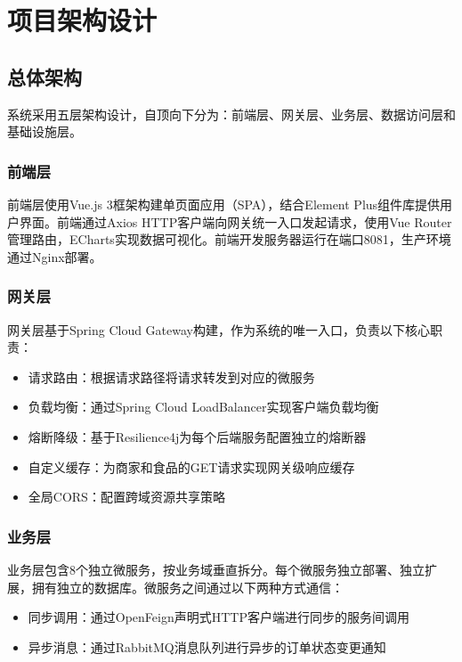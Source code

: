 
\chapter{项目架构设计}

\section{总体架构}

系统采用五层架构设计，自顶向下分为：前端层、网关层、业务层、数据访问层和基础设施层。

\subsection{前端层}

前端层使用Vue.js 3框架构建单页面应用（SPA），结合Element Plus组件库提供用户界面。前端通过Axios HTTP客户端向网关统一入口发起请求，使用Vue Router管理路由，ECharts实现数据可视化。前端开发服务器运行在端口8081，生产环境通过Nginx部署。

\subsection{网关层}

网关层基于Spring Cloud Gateway构建，作为系统的唯一入口，负责以下核心职责：
\begin{itemize}
	\item 请求路由：根据请求路径将请求转发到对应的微服务
	\item 负载均衡：通过Spring Cloud LoadBalancer实现客户端负载均衡
	\item 熔断降级：基于Resilience4j为每个后端服务配置独立的熔断器
	\item 自定义缓存：为商家和食品的GET请求实现网关级响应缓存
	\item 全局CORS：配置跨域资源共享策略
\end{itemize}

\subsection{业务层}

业务层包含8个独立微服务，按业务域垂直拆分。每个微服务独立部署、独立扩展，拥有独立的数据库。微服务之间通过以下两种方式通信：
\begin{itemize}
	\item 同步调用：通过OpenFeign声明式HTTP客户端进行同步的服务间调用
	\item 异步消息：通过RabbitMQ消息队列进行异步的订单状态变更通知
\end{itemize}

